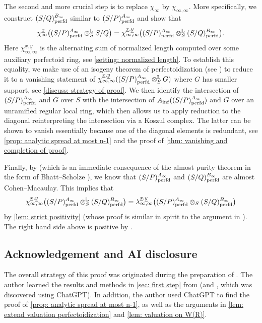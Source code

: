 \documentclass[12pt]{amsart}
\numberwithin{equation}{theorem}
\numberwithin{equation}{theorem}
\newcommand{\perfd}{\textnormal{perfd}}
\begin{document}
The second and more crucial step is to replace $\chi_\infty$ by $\chi_{\infty,\infty}$. More specifically, we construct $(S/Q)^{B_\infty}_\perfd$ similar to $(S/P)^{A_\infty}_\perfd$ and show that 
$$\chi_\infty^{\underline{x}}\big((S/P)^{A_\infty}_\perfd\otimes^\myL_S S/Q\big) =\chi_{\infty,\infty}^{\underline{x},\underline{y}}\big((S/P)^{A_\infty}_\perfd\otimes^\myL_S (S/Q)^{B_\infty}_\perfd\big).$$
Here $\chi_{\infty,\infty}^{\underline{x},\underline{y}}$ is the alternating sum of normalized length computed over some auxiliary perfectoid ring, see \autoref{setting: normalized length}. To establish this equality, we make use of an isogeny theorem of perfectoidization (see \cite[Proposition 2.4.7]{CaiLeeMaSchwedeTuckerPerfdSignature2026}) to reduce it to a vanishing statement of $\chi_{\infty,\infty}^{\underline{x},\underline{y}}((S/P)^{A_\infty}_\perfd\otimes^\myL_S G)$ where $G$ has smaller support, see \autoref{discuss: strategy of proof}. We then identify the intersection of $(S/P)^{A_\infty}_\perfd$ and $G$ over $S$ with the intersection of $A_{\inf}((S/P)^{A_\infty}_\perfd)$ and $G$ over an unramified regular local ring, which then allows us to apply reduction to the diagonal reinterpreting the intersection via a Koszul complex. The latter can be shown to vanish essentially because one of the diagonal elements is redundant, see \autoref{prop: analytic spread at most n-1} and the proof of \autoref{thm: vanishing and completion of proof}. 

Finally, by \cite[Corollary 4.0.4]{CaiLeeMaSchwedeTuckerPerfdSignature2026} (which is an immediate consequence of the almost purity theorem in the form of Bhatt--Scholze \cite[Theorem 10.9]{BhattScholzePrismaticCohomology2022}), we know that $(S/P)^{A_\infty}_\perfd$ and $(S/Q)^{B_\infty}_\perfd$ are almost Cohen--Macaulay. This implies that
$$\chi_{\infty,\infty}^{\underline{x},\underline{y}}\big((S/P)^{A_\infty}_\perfd\otimes^\myL_S (S/Q)^{B_\infty}_\perfd\big) = \lambda_{\infty,\infty}^{\underline{x},\underline{y}}\big((S/P)^{A_\infty}_\perfd\otimes_S (S/Q)^{B_\infty}_\perfd\big)$$
by \autoref{lem: strict positivity} (whose proof is similar in spirit to the argument in \cite[Theorem 6.1]{BhattHochsterMaLimCM2026}). The right hand side above is positive by \cite[Proposition 4.0.20]{CaiLeeMaSchwedeTuckerPerfdSignature2026}. %


\subsection*{Acknowledgement and AI disclosure} 
The overall strategy of this proof was originated during the preparation of \cite{BhattHochsterMaLimCM2026}. The author learned the results and methods in \autoref{sec: first step} from \cite[Section 3]{OpenAISerrePositivity2026} (and \cite[Appendix A]{MaLech2026}, which was discovered using ChatGPT). In addition, the author used ChatGPT to find the proof of \autoref{prop: analytic spread at most n-1}, as well as the arguments in \autoref{lem: extend valuation perfectoidization} and \autoref{lem: valuation on W(R)}.
\end{document}
